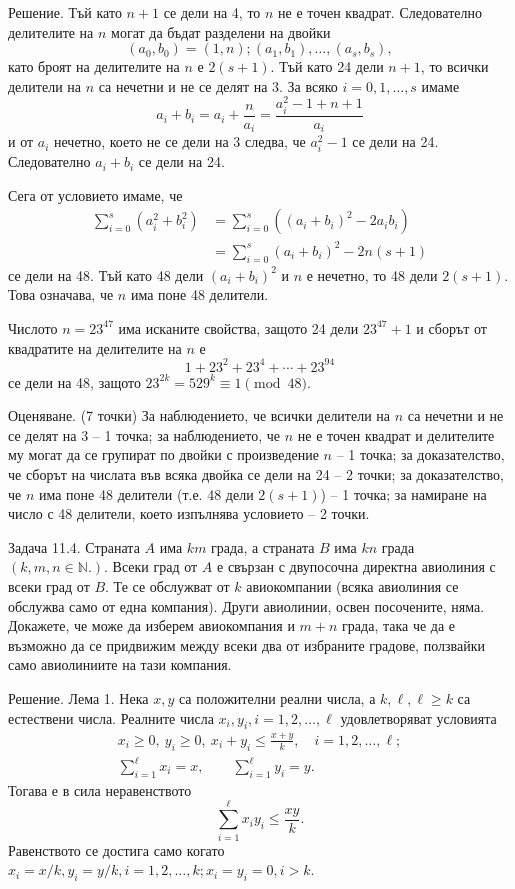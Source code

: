 Решение. Тъй като $n+1$ се дели на 4, то $n$ не е точен квадрат. Следователно делителите на $n$ могат да бъдат разделени на двойки
$$
(a_0,b_0)=(1,n);(a_1,b_1),\ldots,(a_s,b_s),
$$
като броят на делителите на $n$ е $2(s+1)$. Тъй като 24 дели $n+1$, то всички делители на $n$ са нечетни и не се делят на 3. За всяко $i=0,1,\ldots,s$ имаме
$$
a_i+b_i=a_i+\frac{n}{a_i}=\frac{a_i^2-1+n+1}{a_i}
$$
и от $a_i$ нечетно, което не се дели на 3 следва, че $a_i^2-1$ се дели на 24. Следователно $a_i+b_i$ се дели на 24.

Сега от условието имаме, че
$$
\begin{aligned}
\sum_{i=0}^s(a_i^2+b_i^2)&=\sum_{i=0}^s((a_i+b_i)^2-2a_ib_i)\\
&=\sum_{i=0}^s(a_i+b_i)^2-2n(s+1)
\end{aligned}
$$
се дели на 48. Тъй като 48 дели $(a_i+b_i)^2$ и $n$ е нечетно, то 48 дели $2(s+1)$. Това означава, че $n$ има поне 48 делители.

Числото $n=23^{47}$ има исканите свойства, защото 24 дели $23^{47}+1$ и сборът от квадратите на делителите на $n$ е
$$
1+23^2+23^4+\cdots+23^{94}
$$
се дели на 48, защото $23^{2k}=529^k\equiv1\pmod{48}$.

Оценяване. (7 точки) За наблюдението, че всички делители на $n$ са нечетни и не се делят на 3 – 1 точка; за наблюдението, че $n$ не е точен квадрат и делителите му могат да се групират по двойки с произведение $n$ – 1 точка; за доказателство, че сборът на числата във всяка двойка се дели на 24 – 2 точки; за доказателство, че $n$ има поне 48 делители (т.е. 48 дели $2(s+1)$) – 1 точка; за намиране на число с 48 делители, което изпълнява условието – 2 точки.

Задача 11.4. Страната $A$ има $km$ града, а страната $B$ има $kn$ града $(k,m,n\in\mathbb N.)$. Всеки град от $A$ е свързан с двупосочна директна авиолиния с всеки град от $B$. Те се обслужват от $k$ авиокомпании (всяка авиолиния се обслужва само от една компания). Други авиолинии, освен посочените, няма. Докажете, че може да изберем авиокомпания и $m+n$ града, така че да е възможно да се придвижим между всеки два от избраните градове, ползвайки само авиолиниите на тази компания.

Решение. Лема 1. Нека $x,y$ са положителни реални числа, а $k,\ell,\ell\geq k$ са естествени числа. Реалните числа $x_i,y_i,i=1,2,\ldots,\ell$ удовлетворяват условията
$$
\begin{gathered}
x_i\geq0,\ y_i\geq0,\ x_i+y_i\leq\frac{x+y}{k},\quad i=1,2,\ldots,\ell;\\
\sum_{i=1}^{\ell}x_i=x,\qquad \sum_{i=1}^{\ell}y_i=y. \tag{1}
\end{gathered}
$$
Тогава е в сила неравенството
$$
\sum_{i=1}^{\ell}x_iy_i\leq\frac{xy}{k}.
$$
Равенството се достига само когато $x_i=x/k,y_i=y/k,i=1,2,\ldots,k;x_i=y_i=0,i>k$.

